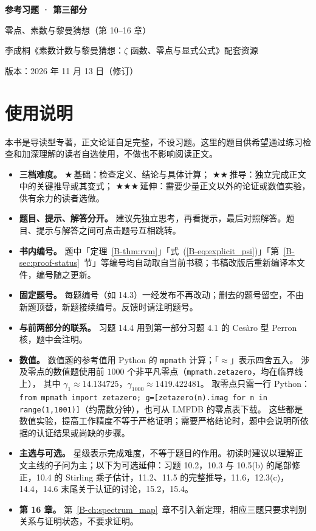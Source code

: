 \documentclass[11pt,a4paper]{article}
\newcommand{\bref}[1]{\ref*{B-#1}}
\newcommand{\lvI}{$\bigstar$\,基础}
\newcommand{\lvII}{$\bigstar\bigstar$\,推导}
\newcommand{\lvIII}{$\bigstar\bigstar\bigstar$\,延伸}
\newcommand{\versiondate}{2026 年 11 月 13 日（修订）}
\begin{document}
\begin{center}
{\LARGE\bfseries 参考习题 · 第三部分\par}
\vspace{0.6em}
{\large 零点、素数与黎曼猜想（第 10–16 章）\par}
\vspace{0.6em}
{\normalsize 李成桐《素数计数与黎曼猜想：$\zeta$ 函数、零点与显式公式》配套资源\par}
\vspace{0.3em}
{\small 版本：\versiondate\par}
\end{center}

\vspace{0.8em}
\section*{使用说明}

本书是导读型专著，正文论证自足完整，不设习题。这里的题目供希望通过练习检查和加深理解的读者自选使用，不做也不影响阅读正文。

\begin{itemize}
  \item \textbf{三档难度。}
    \lvI：检查定义、结论与具体计算；
    \lvII：独立完成正文中的关键推导或其变式；
    \lvIII：需要少量正文以外的论证或数值实验，供有余力的读者选做。
  \item \textbf{题目、提示、解答分开。}
    建议先独立思考，再看提示，最后对照解答。题目、提示与解答之间可点击题号互相跳转。
  \item \textbf{书内编号。}
    题中「定理~\bref{thm:rvm}」「式~(\bref{eq:explicit_psi})」「第~\bref{sec:proof-status}~节」等编号均自动取自当前书稿；书稿改版后重新编译本文件，编号随之更新。
  \item \textbf{固定题号。}
    每题编号（如 14.3）一经发布不再改动；删去的题号留空，不由新题顶替，新题接续编号。反馈时请注明题号。
  \item \textbf{与前两部分的联系。}
    习题 14.4 用到第一部分习题 4.1 的 Cesàro 型 Perron 核，题中会注明。
  \item \textbf{数值。}
    数值题的参考值用 Python 的 \texttt{mpmath} 计算；「$\approx$」表示四舍五入。
    涉及零点的数值题使用前 $1000$ 个非平凡零点（\texttt{mpmath.zetazero}，均在临界线上），
    其中 $\gamma_1\approx14.134725$，$\gamma_{1000}\approx1419.422481$。
    取零点只需一行 Python：\texttt{from mpmath import zetazero; g=[zetazero(n).imag for n in range(1,1001)]}（约需数分钟），也可从 LMFDB 的零点表下载。
    这些都是数值实验，提高工作精度不等于严格证明；需要严格结论时，题中会说明所依据的认证结果或尚缺的步骤。
  \item \textbf{主选与可选。}
    星级表示完成难度，不等于题目的作用。初读时建议以理解正文主线的子问为主；以下为可选延伸：习题 10.2，10.3 与 10.5(b) 的尾部修正，10.4 的 Stirling 乘子估计，11.2、11.5 的完整推导，11.6，12.3(c)，14.4，14.6 末尾关于认证的讨论，15.2，15.4。
  \item \textbf{第 16 章。}
    第~\bref{ch:spectrum_map}~章不引入新定理，相应三题只要求判别关系与证明状态，不要求证明。
\end{itemize}
\end{document}
